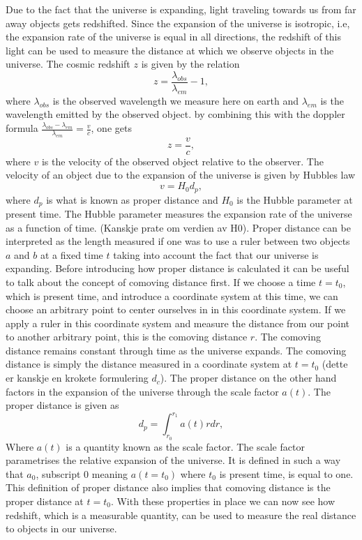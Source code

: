 Due to the fact that the universe is expanding, light traveling towards us from
far away objects gets redshifted. Since the expansion of the universe is
isotropic, i.e, the expansion rate of the universe is equal in all directions,
the redshift of this light can be used to measure the distance at which we
observe objects in the universe. The cosmic redshift $z$ is given by the
relation
\begin{equation}
    z = \frac{\lambda_{obs}}{\lambda_{em}} - 1,
\end{equation}
where $\lambda_{obs}$ is the observed wavelength we measure here on earth and
$\lambda_{em}$ is the wavelength emitted by the observed object. by combining this with the doppler formula
$\frac{\lambda_{obs}-\lambda_{em}}{\lambda_{em}} = \frac{v}{c}$, one gets
\begin{equation}
    z = \frac{v}{c},
\end{equation}
where $v$ is the velocity of the observed object relative to the observer. The
velocity of an object due to the expansion of the universe is given by Hubbles law
\begin{equation}
    v = H_0 d_p,
\end{equation}
where $d_p$ is what is known as proper distance and $H_0$ is the Hubble
parameter at present time. The Hubble parameter measures the expansion rate of
the universe as a function of time. (Kanskje prate om verdien av H0). Proper distance can be interpreted as the length measured if one
was to use a ruler between two objects $a$ and $b$ at a fixed time $t$ taking
into account the fact that our universe is expanding. Before introducing how proper distance is calculated it can be
useful to talk about the concept of comoving distance first. If we choose a time
$t=t_0$, which is present time, and introduce a coordinate system at this time,
we can choose an arbitrary point to center ourselves in in this coordinate
system. If we apply a ruler in this coordinate system and measure the distance
from our point to another arbitrary point, this is the comoving distance $r$.
The comoving distance remains constant through time as the universe expands. The
comoving distance is simply the distance measured in a coordinate system at
$t=t_0$ (dette er kanskje en krokete formulering $d_c$). The proper distance on the other hand factors in the expansion of the
universe through the scale factor $a(t)$. The proper distance is given as
\begin{equation}
    d_p = \int_{r_0}^{r_1}a(t)rdr,
\end{equation}
Where $a(t)$ is a quantity known as the scale factor. The scale factor parametrises the relative expansion of the
universe. It is defined in such a way that $a_0$, subscript $0$ meaning
$a(t=t_0)$ where $t_0$ is present time, is equal to one. This definition of
proper distance also implies that comoving distance is the proper distance at $t=t_0$.
With these properties in place we can now see how redshift, which is a
measurable quantity, can be used to measure the real distance to objects in our universe.\\


